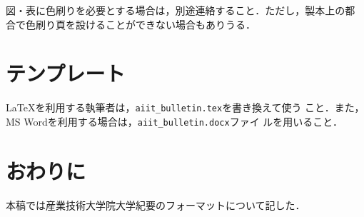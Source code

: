 \documentclass[a4j, 12Q, twocolumn, twoside]{jsarticle}
\begin{document}
図・表に色刷りを必要とする場合は，別途連絡すること．ただし，製本上の都
合で色刷り頁を設けることができない場合もありうる．

\section{テンプレート}
\LaTeX を利用する執筆者は，\texttt{aiit\_bulletin.tex}を書き換えて使う
こと．また，MS Wordを利用する場合は，\texttt{aiit\_bulletin.docx}ファイ
ルを用いること．

\section{おわりに}
本稿では産業技術大学院大学紀要のフォーマットについて記した．



\end{document}
